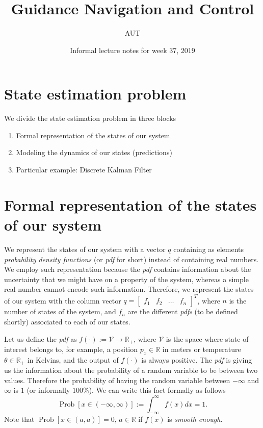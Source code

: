 \documentclass[11pt,a4paper]{article}
\title{Guidance Navigation and Control}
\author{AUT}
\date{Informal lecture notes for week 37, 2019}
\begin{document}
\maketitle
\section{State estimation problem}

We divide the state estimation problem in three blocks
\begin{enumerate}
	\item Formal representation of the states of our system
	\item Modeling the dynamics of our states (predictions)
	\item Particular example: Discrete Kalman Filter
\end{enumerate}

\section{Formal representation of the states of our system}
We represent the states of our system with a vector $q$ containing as elements \emph{probability density functions} (or \emph{pdf} for short) instead of containing real numbers. We employ such representation because the \emph{pdf} contains information about the uncertainty that we might have on a property of the system, whereas a simple real number cannot encode such information. Therefore, we represent the states of our system with the column vector $q = \begin{bmatrix} f_1 & f_2 & \dots & f_n \end{bmatrix}^T$, where $n$ is the number of states of the system, and $f_n$ are the different \emph{pdfs} (to be defined shortly) associated to each of our states.

Let us define the \emph{pdf} as $f(\cdot) := \mathcal{V} \to \mathbb{R}_+$, where $\mathcal{V}$ is the space where state of interest belongs to, for example, a position $p_x\in\mathbb{R}$ in meters or temperature $\theta\in\mathbb{R}_+$ in Kelvins, and the output of $f(\cdot)$ is always positive. The \emph{pdf} is giving us the information about the probability of a random variable to be between two values. Therefore the probability of having the random variable between $-\infty$ and $\infty$ is $1$ (or informally $100\%$). We can write this fact formally as follows
\begin{equation}
\operatorname{Prob}[x\in (-\infty,\infty)] := \int_{-\infty}^{\infty} f(x) dx = 1.
	\label{eq: fus}
\end{equation}
Note that $\operatorname{Prob}[x\in (a,a)] = 0, \, a\in\mathbb{R}$ if $f(x)$ is 
\emph{smooth enough}.
\end{document}
